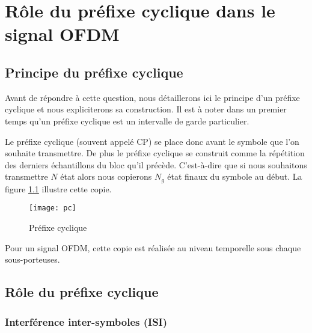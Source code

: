 \chapter{Rôle du préfixe cyclique dans le signal OFDM}

\section{Principe du préfixe cyclique}

Avant de répondre à cette question, nous détaillerons ici le principe d'un
préfixe cyclique et nous expliciterons sa construction. Il est à noter dans un
premier temps qu'un préfixe cyclique est un intervalle de garde
particulier. ~\\


Le préfixe cyclique (souvent appelé CP) se place donc avant le symbole que l'on
souhaite transmettre. De plus le préfixe cyclique se construit comme la
répétition des derniers échantillons du bloc qu'il précède. C'est-à-dire que si
nous souhaitons transmettre $N$ état alors nous copierons $N_g$ état finaux du
symbole au début. La figure \ref{fig:PC} illustre cette copie.

\begin{figure}[!h]
  \centering
  \texttt{[image: pc]}
  \caption{Préfixe cyclique}
  \label{fig:PC}
\end{figure}

Pour un signal OFDM, cette copie est réalisée au niveau temporelle sous chaque
sous-porteuses.

\section{Rôle du préfixe cyclique}

\subsection{Interférence inter-symboles (ISI)}
\label{sec:ISI}





